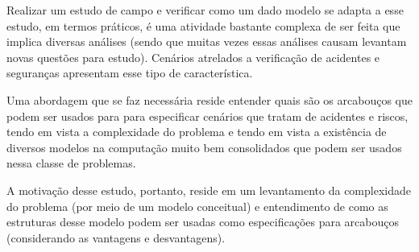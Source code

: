 Realizar um estudo de campo e verificar como um dado modelo se adapta a esse estudo, em termos práticos, é uma atividade bastante complexa de ser feita que implica diversas análises (sendo que muitas vezes essas análises causam levantam novas questões para estudo). Cenários atrelados a verificação de acidentes e seguranças apresentam esse tipo de característica. 

Uma abordagem que se faz necessária reside entender quais são os arcabouços que podem ser usados para para especificar cenários que tratam de acidentes e riscos, tendo em vista a complexidade do problema e tendo em vista a existência de diversos modelos na computação muito bem consolidados que podem ser usados nessa classe de problemas. 

A motivação desse estudo, portanto, reside em um levantamento da complexidade do problema (por meio de um modelo conceitual) e entendimento de como as estruturas desse modelo podem ser usadas como especificações para arcabouços (considerando as vantagens e desvantagens).